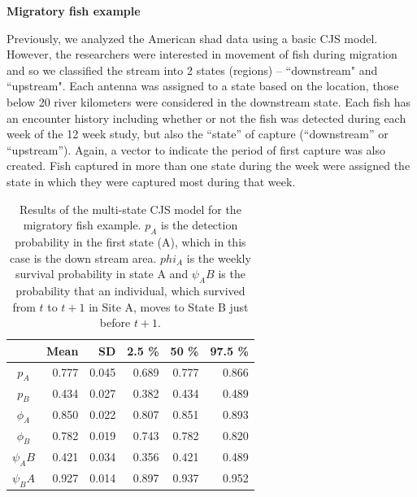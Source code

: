 {\bf Migratory fish example}

Previously, we analyzed the American shad data using a basic CJS
model.  However,
the researchers were interested in movement of fish during migration and so we
classified the stream into 2 states (regions) -- ``downstream" and ``upstream".  Each antenna was assigned
to a state based on the location, those below 20 river kilometers were considered in
the downstream state.  Each fish has an encounter history including whether or not the fish was
detected during each week of the 12 week study, but also the ``state'' of capture
(``downstream'' or ``upstream'').  Again, a vector to indicate the period of first capture was also
created.  Fish captured in more than one state during the week were assigned the state in which 
they were captured most during that week.


\begin{table}
\centering
\caption{
Results of the multi-state CJS model for the migratory fish example.  $p_A$ is the detection probability in the first state (A), which in this case is the down stream area.  $phi_A$ is the weekly survival probability in state A and $\psi_AB$ is the probability that an individual, which survived from $t$ to $t+1$ in Site A, moves to State B just
before $t+1$.
}
\begin{tabular}{crrrrr}
\hline \hline
&       Mean   &  SD  &  2.5 \%   &   50 \%    &  97.5 \%  \\  \hline
$p_A$ & 0.777 & 0.045 & 0.689  & 0.777  & 0.866 \\
$p_B$  & 0.434  & 0.027 & 0.382 & 0.434  & 0.489 \\
$\phi_A$  & 0.850 & 0.022 & 0.807  & 0.851  & 0.893  \\
$\phi_B$  & 0.782  & 0.019 & 0.743  & 0.782& 0.820  \\
$\psi_AB$ & 0.421 & 0.034 & 0.356  & 0.421 &  0.489 \\
$\psi_BA$& 0.927 & 0.014 & 0.897  & 0.937 &  0.952  \\

\hline
\end{tabular}
\label{open.tab.multi-shad}
\end{table}

